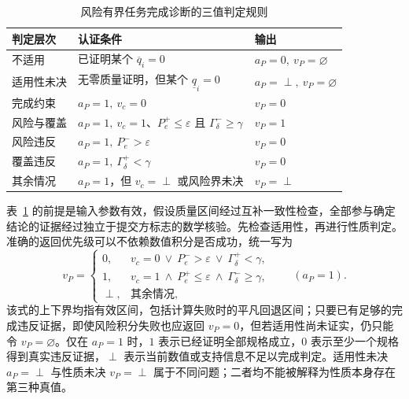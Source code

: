 \documentclass[master,fontset=ubuntu]{shnuthesis}
\DeclareRobustCommand{\probstatus}[1]{\ensuremath{#1}}
\theoremstyle{definition}
\begin{document}
\begin{table}[htbp]
\centering
\small
\caption{风险有界任务完成诊断的三值判定规则}
\label{tab:three-way-decision}
\renewcommand{\arraystretch}{1.18}
\begin{tabularx}{\textwidth}{>{\centering\arraybackslash}p{2.3cm}>{\raggedright\arraybackslash}X>{\centering\arraybackslash}p{2.1cm}}
\hline
判定层次 & 认证条件 & 输出\\
\hline
不适用 & 已证明某个 \(\overline q_i=0\) & \(a_P=0,\ v_P=\varnothing\)\\
适用性未决 & 无零质量证明，但某个 \(\underline q_i=0\) & \(a_P=\perp,\ v_P=\varnothing\)\\
完成约束 & \(a_P=1,\ v_c=0\) & \(v_P=0\)\\
风险与覆盖 & \(a_P=1,\ v_c=1\)、\(P_e^+\leq\varepsilon\) 且 \(\Gamma_\delta^-\geq\gamma\) & \(v_P=1\)\\
风险违反 & \(a_P=1,\ P_e^->\varepsilon\) & \(v_P=0\)\\
覆盖违反 & \(a_P=1,\ \Gamma_\delta^+<\gamma\) & \(v_P=0\)\\
其余情况 & \(a_P=1\)，但 \(v_c=\perp\) 或风险界未决 & \(v_P=\perp\)\\
\hline
\end{tabularx}
\end{table}

表~\ref{tab:three-way-decision} 的前提是输入参数有效，假设质量区间经过互补一致性检查，全部参与确定结论的证据经过独立于提交方标志的数学核验。先检查适用性，再进行性质判定。准确的返回优先级可以不依赖数值积分是否成功，统一写为
\begin{equation}
 v_P=\begin{cases}
 0,& v_c=0\ \vee\ P_e^->\varepsilon\ \vee\ \Gamma_\delta^+<\gamma,\\
 1,& v_c=1\ \wedge\ P_e^+\leq\varepsilon\ \wedge\ \Gamma_\delta^-\geq\gamma,\\
 \perp,&\text{其余情况},
 \end{cases}\qquad (a_P=1).
\label{eq:probability-verdict-priority}
\end{equation}
该式的上下界均指有效区间，包括计算失败时的平凡回退区间；只要已有足够的完成违反证据，即使风险积分失败也应返回 $v_P=0$，但若适用性尚未证实，仍只能令 $v_P=\varnothing$。仅在 $a_P=1$ 时，\probstatus{1} 表示已经证明全部规格成立，\probstatus{0} 表示至少一个规格得到真实违反证据，\probstatus{\perp} 表示当前数值或支持信息不足以完成判定。适用性未决 \(a_P=\perp\) 与性质未决 \(v_P=\perp\) 属于不同问题；二者均不能被解释为性质本身存在第三种真值。
\end{document}
